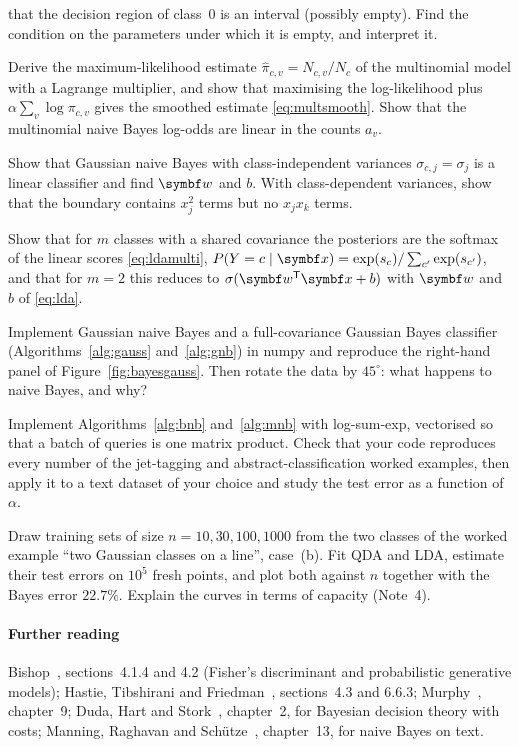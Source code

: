 \documentclass[11pt]{article}
\newcommand{\w}{\vect{w}}
\begin{document}
\begin{questions}
\begin{derivations}
that the decision region of class~0 is an interval (possibly empty). Find the condition on the parameters under which
it is empty, and interpret it.
\item Derive the maximum-likelihood estimate $\hat\pi_{c,v} = N_{c,v}/N_c$ of the multinomial model with a Lagrange
multiplier, and show that maximising the log-likelihood plus $\alpha \sum_v \log \pi_{c,v}$ gives the smoothed estimate
\eqref{eq:multsmooth}. Show that the multinomial naive Bayes log-odds are linear in the counts $a_v$.
\item Show that Gaussian naive Bayes with class-independent variances $\sigma_{c,j} = \sigma_j$ is a linear classifier
and find $\w$ and $b$. With class-dependent variances, show that the boundary contains $x_j^2$ terms but no $x_j x_k$
terms.
\item Show that for $m$ classes with a shared covariance the posteriors are the softmax of the linear scores
\eqref{eq:ldamulti}, $P(Y = c \mid \x) = \exp(s_c) / \sum_{c'} \exp(s_{c'})$, and that for $m = 2$ this reduces to
$\sigma(\w\T\x + b)$ with $\w$ and $b$ of \eqref{eq:lda}.
\end{derivations}
\begin{programming}
\item Implement Gaussian naive Bayes and a full-covariance Gaussian Bayes classifier (Algorithms~\ref{alg:gauss}
and~\ref{alg:gnb}) in numpy and reproduce the right-hand panel of Figure~\ref{fig:bayesgauss}. Then rotate the data by
$45^\circ$: what happens to naive Bayes, and why?
\item Implement Algorithms~\ref{alg:bnb} and~\ref{alg:mnb} with log-sum-exp, vectorised so that a batch of queries is
one matrix product. Check that your code reproduces every number of the jet-tagging and abstract-classification worked
examples, then apply it to a text dataset of your choice and study the test error as a function of $\alpha$.
\item Draw training sets of size $n = 10, 30, 100, 1000$ from the two classes of the worked example ``two Gaussian
classes on a line'', case~(b). Fit QDA and LDA, estimate their test errors on $10^5$ fresh points, and plot both against
$n$ together with the Bayes error $22.7\%$. Explain the curves in terms of capacity (Note~4).
\end{programming}
\end{questions}

\paragraph{Further reading} Bishop~\cite{bishop2006}, sections~4.1.4 and 4.2 (Fisher's discriminant and
probabilistic generative models); Hastie, Tibshirani and Friedman~\cite{hastie2009}, sections~4.3 and 6.6.3;
Murphy~\cite{murphy2022}, chapter~9; Duda, Hart and Stork~\cite{duda2001}, chapter~2, for Bayesian decision theory
with costs; Manning, Raghavan and Sch\"utze~\cite{manning2008}, chapter~13, for naive Bayes on text.
\end{document}

